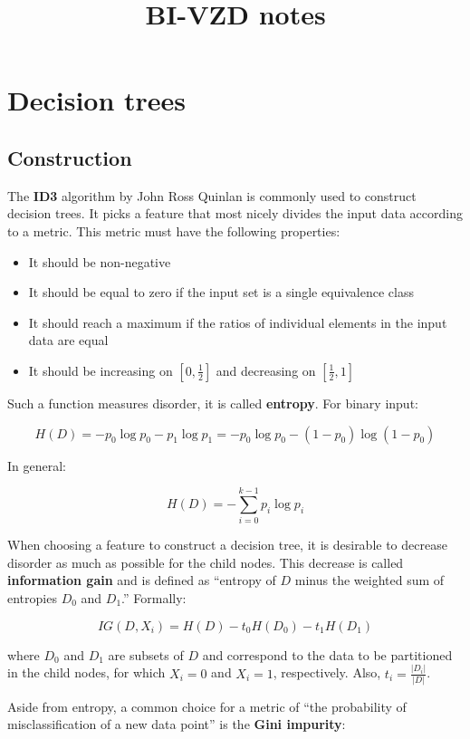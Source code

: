 \documentclass[a4paper]{article}
\title{BI-VZD notes}
\begin{document}
	\maketitle

	\section{Decision trees}

	\subsection{Construction}
	The \textbf{ID3} algorithm by John Ross Quinlan is commonly used to construct decision trees.
	It picks a feature that most nicely divides the input data according to a metric.
	This metric must have the following properties:
	\begin{itemize}
		\item It should be non-negative
		\item It should be equal to zero if the input set is a single equivalence class
		\item It should reach a maximum if the ratios of individual elements in the input data are equal
		\item It should be increasing on $[0, \frac{1}{2}]$ and decreasing on $[\frac{1}{2}, 1]$
	\end{itemize}
	Such a function measures disorder, it is called \textbf{entropy}. For binary input:

	$$H(D) = -p_0 \log p_0 - p_1 \log p_1 = -p_0 \log p_0 - (1 - p_0) \log (1 - p_0)$$

	In general:

	$$H(D) = - \sum_{i = 0}^{k - 1} p_i \log p_i$$

	When choosing a feature to construct a decision tree, it is desirable to decrease
	disorder as much as possible for the child nodes. This decrease is called
	\textbf{information gain} and is defined as \enquote{entropy of $D$ minus the
	weighted sum of entropies $D_0$ and $D_1$.} Formally:

	$$IG(D, X_i) = H(D) - t_0H(D_0) - t_1H(D_1)$$

	where $D_0$ and $D_1$ are subsets of $D$ and correspond to the data to be partitioned
	in the child nodes, for which $X_i = 0$ and $X_i = 1$, respectively.
	Also, $t_i = \frac{|D_i|}{|D|}$.

	Aside from entropy, a common choice for a metric of \enquote{the probability of
	misclassification of a new data point} is the \textbf{Gini impurity}:
\end{document}
